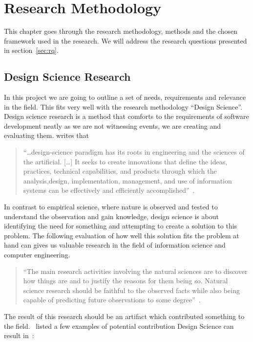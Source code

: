 \documentclass[../Main/thesis.tex]{subfiles}
\begin{document}
\chapter{Research Methodology}\label{ch:methodology}
This chapter goes through the research methodology, methods and the chosen
framework used in the research. We will address the research questions presented
in section~\ref{sec:rq}.

\section{Design Science Research}%
\label{sec:design_science_research}
In this project we are going to outline a set of needs, requirements and
relevance in the field. This fits very well with the research methodology
``Design Science''.  Design science research is a method that comforts to the
requirements of software development neatly as we are not witnessing events, we
are creating and evaluating them. \citeauthor{Hevner:2004:DSI:2017212.2017217} writes that

\begin{quotation}
``\ldots design-science paradigm has its roots in engineering and the sciences of the
artificial. [\ldots] It seeks to create innovations that define the ideas,
practices, technical capabilities, and products through which the
analysis,design, implementation, management, and use of information systems can
be effectively and efficiently
accomplished''~\cite{Hevner:2004:DSI:2017212.2017217}.
\end{quotation}

In contrast to empirical science, where nature is observed and tested to
understand the observation and gain knowledge, design science is about
identifying the need for something and attempting to create a solution to this
problem. The following evaluation of how well this solution fits the problem at
hand can gives us valuable research in the field of information science and
computer engineering.

\begin{quotation}
``The main research activities involving the natural sciences are to discover how
things are and to justify the reasons for them being so. Natural science
research should be faithful to the observed facts while also being capable of
predicting future observations to some degree''~\cite{Dresch:2014:DSR:2671159}.
\end{quotation}

The result of this research should be an artifact which contributed something to
the field.~\citeauthor{Vaishnavi:2015:DSR:2807332} listed a few examples of
potential contribution Design Science can result in~\cite{Vaishnavi:2015:DSR:2807332}:
\end{document}
